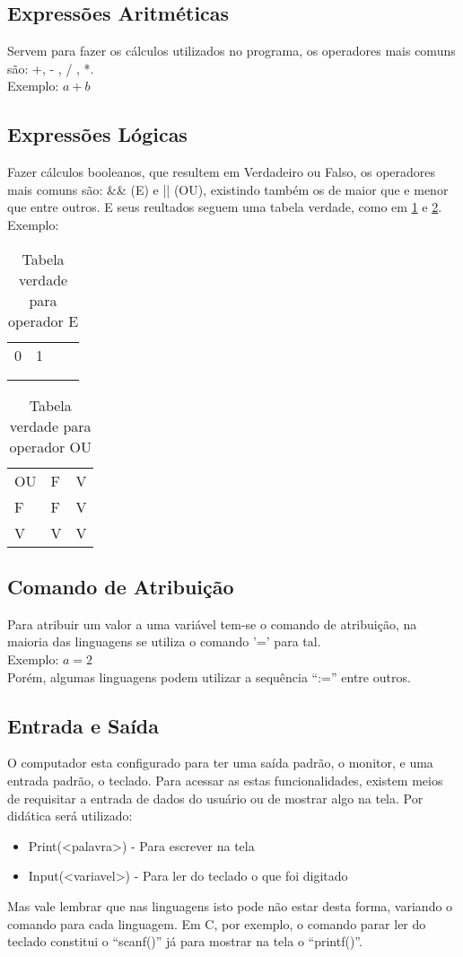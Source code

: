 \subsection{Expressões Aritméticas}
Servem para fazer os cálculos utilizados no programa, os operadores mais comuns são: +, - , / , *.\\ 
Exemplo: $ a + b $
\subsection{Expressões Lógicas}
Fazer cálculos booleanos, que resultem em Verdadeiro ou Falso, os operadores mais comuns são: \&\& (E) e || (OU), existindo também os de maior que e menor que entre outros. E seus reultados seguem uma tabela verdade, como em \ref{tab:vE} e \ref{tab:vOU}.
Exemplo: \\
\begin{table}[!h]
\centering
\caption{Tabela verdade para operador E}
\label{tab:vE}
\begin{tabular}{llll} \hline \hline
0 & 1 &  &  \\
&   &  &  \\
&   &  &  \\ \hline \hline
\end{tabular}
\end{table}

\begin{table}[!h]
\centering
\caption{Tabela verdade para operador OU}
\label{tab:vOU}
\begin{tabular}{lll}
OU & F & V \\
F  & F & V \\
V  & V & V
\end{tabular}
\end{table}
\subsection{Comando de Atribuição}
Para atribuir um valor a uma variável tem-se o comando de atribuição, na maioria das linguagens se utiliza o comando '=' para tal. \\
Exemplo: $ a = 2 $ \\
Porém, algumas linguagens podem utilizar a sequência ``:='' entre outros.
\subsection{Entrada e Saída}
O computador esta configurado para ter uma saída padrão, o monitor, e uma entrada padrão, o teclado. Para acessar as estas funcionalidades, existem meios de requisitar a entrada de dados do usuário ou de mostrar algo na tela. Por didática será utilizado:
\begin{itemize}
    \item Print(<palavra>) - Para escrever na tela
    \item Input(<variavel>) - Para ler do teclado o que foi digitado
\end{itemize}
Mas vale lembrar que nas linguagens isto pode não estar desta forma, variando o comando para cada linguagem. Em C, por exemplo, o comando parar ler do teclado constitui o ``scanf()'' já para mostrar na tela o ``printf()''.

